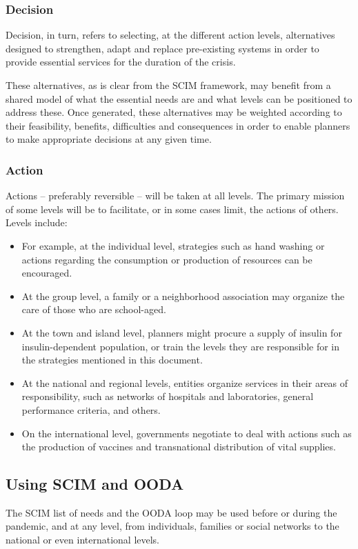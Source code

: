 \documentclass[12pt, a4]{scrartcl}
\begin{document}
\subsubsection{Decision}
Decision, in turn, refers to selecting, at the different action levels, alternatives designed to strengthen, adapt and replace pre-existing systems in order to provide essential services for the duration of the crisis.

These alternatives, as is clear from the SCIM framework, may benefit from a shared model of what the essential needs are and what levels can be positioned to address these. Once generated, these alternatives may be weighted according to their feasibility, benefits, difficulties and consequences in order to enable planners to make appropriate decisions at any given time.

\subsubsection{Action}
Actions – preferably reversible – will be taken at all levels. The primary mission of some levels will
be to facilitate, or in some cases limit, the actions of others. Levels include:
\begin{itemize}
	\item For example, at the individual level, strategies such as hand washing or actions regarding the consumption or production of resources can be encouraged.
	\item At the group level, a family or a neighborhood association may organize the care of those who are school-aged.
	\item At the town and island level, planners might procure a supply of insulin for insulin-dependent population, or train the levels they are responsible for in the strategies mentioned in this document.
	\item At the national and regional levels, entities organize services in their areas of responsibility, such as networks of hospitals and laboratories, general performance criteria, and others.
	\item On the international level, governments negotiate to deal with actions such as the production of vaccines and transnational distribution of vital supplies.
\end{itemize}

\subsection{Using SCIM and OODA}
The SCIM list of needs and the OODA loop may be used before or during the pandemic, and at any level, from individuals, families or social networks to the national or even international levels.
\end{document}
